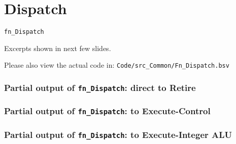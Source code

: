 
\section{Dispatch}

\begin{frame}

\begin{center}
  {\LARGE\tt fn\_Dispatch}

  \vspace{5ex}

  Excerpts shown in next few slides.

  Please also view the actual code in:
  {\tt Code/src\_Common/Fn\_Dispatch.bsv}

\end{center}

\end{frame}


\begin{frame}[fragile]
\frametitle{Partial output of {\tt fn\_Dispatch}: direct to Retire}

\footnotesize


\end{frame}


\begin{frame}[fragile]
\frametitle{Partial output of {\tt fn\_Dispatch}: to Execute-Control}

\footnotesize


\end{frame}


\begin{frame}[fragile]
\frametitle{Partial output of {\tt fn\_Dispatch}: to Execute-Integer ALU}

\footnotesize


\end{frame}


